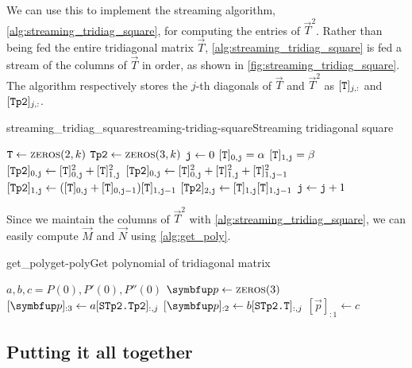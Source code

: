 We can use this to implement the streaming algorithm, \cref{alg:streaming_tridiag_square}, for computing the entries of $\vec{T}^2$.
Rather than being fed the entire tridiagonal matrix $\vec{T}$, \cref{alg:streaming_tridiag_square} is fed a stream of the columns of $\vec{T}$ in order, as shown in \cref{fig:streaming_tridiag_square}.
The algorithm respectively stores the $j$-th diagonals of $\vec{T}$ and $\vec{T}^2$  as $[\texttt{T}]_{j,:}$ and $[\texttt{Tp2}]_{j,:}$.

\begin{labelalgorithm}[htb]{streaming_tridiag_square}{streaming-tridiag-square}{Streaming tridiagonal square}
\begin{algorithmic}[1]
\State $\texttt{T} \gets \textsc{zeros}(2,k)$
\State $\texttt{Tp2} \gets \textsc{zeros}(3,k)$
\State $\texttt{j}\gets0$
\State $[\texttt{T}]_{0,\texttt{j}} = \alpha$
\State $[\texttt{T}]_{1,\texttt{j}} = \beta$
\State $[\texttt{Tp2}]_{0,\texttt{j}} \gets [\texttt{T}]_{0,\texttt{j}}^2+[\texttt{T}]_{1,\texttt{j}}^2$
\Else
\State $[\texttt{Tp2}]_{0,\texttt{j}} \gets [\texttt{T}]_{0,\texttt{j}}^2+[\texttt{T}]_{1,\texttt{j}}^2+[\texttt{T}]_{1,\texttt{j}-1}^2$
\State $[\texttt{Tp2}]_{1,\texttt{j}} \gets ([\texttt{T}]_{0,\texttt{j}}+[\texttt{T}]_{0,\texttt{j}-1})[\texttt{T}]_{1,\texttt{j}-1}$
\State $[\texttt{Tp2}]_{2,\texttt{j}} \gets [\texttt{T}]_{1,\texttt{j}}[\texttt{T}]_{1,\texttt{j}-1}$
\EndIf
\State $\texttt{j}\gets \texttt{j}+1$
\EndProcedure
\EndClass
\end{algorithmic}
\end{labelalgorithm}




Since we maintain the columns of $\vec{T}^2$ with \cref{alg:streaming_tridiag_square}, we can easily compute $\vec{M}$ and $\vec{N}$ using \cref{alg:get_poly}.

\begin{labelalgorithm}[htb]{get_poly}{get-poly}{Get polynomial of tridiagonal matrix}
\begin{algorithmic}[1]
\State $a,b,c = P(0), P'(0), P''(0)$
\State $\vec{p} \gets \textsc{zeros}(3)$
\State $[\vec{p}]_{:3} \gets a [\ms{STp2.}\ms{Tp2}]_{:,j}$
\State $[\vec{p}]_{:2} \gets b [\ms{STp2.}\ms{T}]_{:,j}$
\State $[\vec{p}]_{:1} \gets c $
\EndProcedure
\end{algorithmic}
\end{labelalgorithm}

\subsection{Putting it all together}

